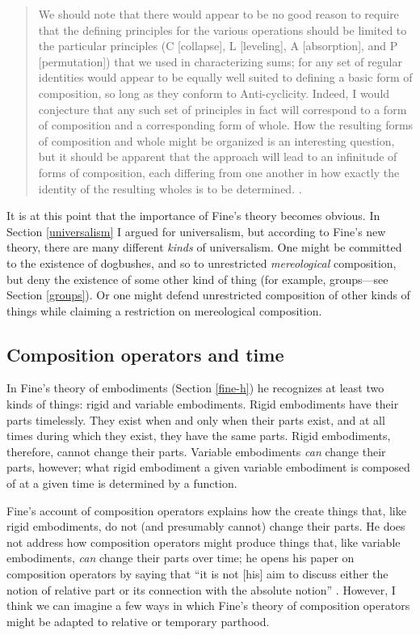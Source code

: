 \documentclass[12pt,twoside]{reedfancy}
\begin{document}
\begin{spacing}{1.25}
\begin{quote}
We should note that there would appear to be no good reason to require
that the defining principles for the various operations should be
limited to the particular principles (C [collapse], L [leveling], A
[absorption], and P [permutation]) that we used in characterizing
sums; for any set of regular identities would appear to be equally
well suited to defining a basic form of composition, so long as they
conform to Anti-cyclicity.  Indeed, I would conjecture that any such
set of principles in fact will correspond to a form of composition and
a corresponding form of whole.  How the resulting forms of composition
and whole might be organized is an interesting question, but it should
be apparent that the approach will lead to an infinitude of forms of
composition, each differing from one another in how exactly the
identity of the resulting wholes is to be
determined. \citep[575--576]{fine2010}.
\end{quote}

It is at this point that the importance of Fine's theory becomes
obvious.  In Section \ref{universalism} I argued for universalism, but
according to Fine's new theory, there are many different {\em kinds}
of universalism.  One might be committed to the existence of
dogbushes, and so to unrestricted {\em mereological} composition, but
deny the existence of some other kind of thing (for example,
groups---see Section \ref{groups}).  Or one might defend unrestricted
composition of other kinds of things while claiming a restriction on
mereological composition.

\subsection{Composition operators and time}
\label{c-change}
In Fine's theory of embodiments (Section \ref{fine-h}) he recognizes
at least two kinds of things: rigid and variable embodiments.  Rigid
embodiments have their parts timelessly.  They exist when and only
when their parts exist, and at all times during which they exist, they
have the same parts.  Rigid embodiments, therefore, cannot change
their parts.  Variable embodiments {\em can} change their parts,
however; what rigid embodiment a given variable embodiment is composed
of at a given time is determined by a function.

Fine's account of composition operators explains how the create things
that, like rigid embodiments, do not (and presumably cannot) change
their parts.  He does not address how composition operators might
produce things that, like variable embodiments, {\em can} change their
parts over time; he opens his paper on composition operators by saying
that ``it is not [his] aim to discuss either the notion of relative
part or its connection with the absolute notion''
\citeyearpar[559]{fine2010}.  However, I think we can imagine a few
ways in which Fine's theory of composition operators might be adapted
to relative or temporary parthood.


\end{spacing}
\end{document}
